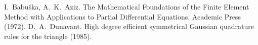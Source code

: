 \documentclass{amsart}
\theoremstyle{definition}
\begin{document}
\begin{thebibliography}{1}
 I.~Babu\v{s}ka, A.~K.~Aziz. The Mathematical Foundations of the Finite Element Method with Applications to Partial Differential Equations. Academic Press (1972).
 D.~A.~Dunavant. High degree efficient symmetrical Gaussian quadrature rules for the triangle (1985).
\end{thebibliography}
\end{document}
